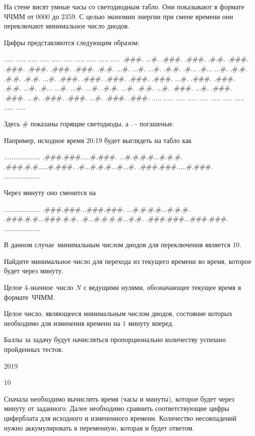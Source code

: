 
На стене висят умные часы со светодиодным табло. Они показывают в формате ЧЧММ от $0000$ до $2359$. С целью экономии энергии при смене времени они переключают минимальное число диодов.

Цифры представляются следующим образом:

..... ..... ..... ..... ..... ..... ..... ..... ..... .....
.###. ...#. .###. .###. .#.#. .###. .###. .###. .###. .###.
.#.#. ...#. ...#. ...#. .#.#. .#... .#... ...#. .#.#. .#.#.
.#.#. ...#. .###. .###. .###. .###. .###. ...#. .###. .###.
.#.#. ...#. .#... ...#. ...#. ...#. .#.#. ...#. .#.#. ...#.
.###. ...#. .###. .###. ...#. .###. .###. ...#. .###. .###.
..... ..... ..... ..... ..... ..... ..... ..... ..... .....

Здесь # показаны горящие светодиоды, а . - погашеные.

Например, исходное время 20:19 будет выглядеть на табло как

...................
.###.###.....#.###.
...#.#.#.#...#.#.#.
.###.#.#.....#.###.
.#...#.#.#...#...#.
.###.###.....#.###.
...................

Через минуту оно сменится на  

...................
.###.###...###.###.
...#.#.#.#...#.#.#.
.###.#.#...###.#.#.
.#...#.#.#.#...#.#.
.###.###...###.###.
...................


В данном случае минимальным числом диодов для переключения является $10$.

Найдите минимальное число для перехода из текущего времени во время, которое будет через минуту.


Целое $4$-значное число $N$ с ведущими нулями, обозначающее текущее время в формате ЧЧММ.

\outputfmtSection

Целое число, являющееся минимальным числом диодов, состояние которых необходимо для изменения времени на $1$ минуту вперед.

\markSection

Баллы за задачу будут начисляться пропорционально количеству успешно пройденных тестов.


\begin{myverbbox}[\small]{\vinput}
    2019
\end{myverbbox}
\begin{myverbbox}[\small]{\voutput}
    10
\end{myverbbox}

\solutionSection

Сначала необходимо вычислить время (часы и минуты), которое будет через минуту от заданного. Далее необходимо сравнить соответствующие цифры циферблата для исходного и измененного времени. Количество несовпадений нужно аккумулировать в переменную, которая и будет ответом.

